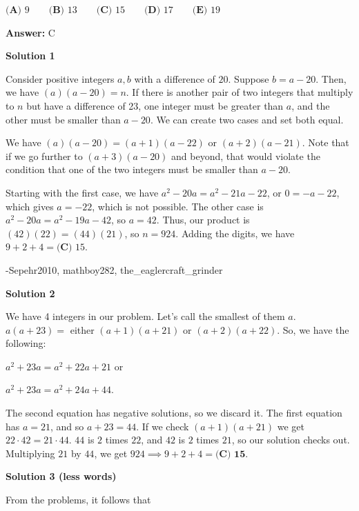 \begin{enumerate}
 $\textbf{(A) } 9 \qquad \textbf{(B) } 13\qquad \textbf{(C) } 15 \qquad \textbf{(D) } 17 \qquad \textbf{(E) } 19$

 \textbf{Answer: }C



\textbf{Solution 1}

Consider positive integers $a, b$ with a difference of $20$. Suppose $b = a-20$. Then, we have $(a)(a-20) = n$. If there is another pair of two integers that multiply to $n$ but have a difference of 23, one integer must be greater than $a$, and the other must be smaller than $a-20$. We can create two cases and set both equal. 

 We have $(a)(a-20) = (a+1)(a-22) \text{ or } (a+2)(a-21).$ Note that if we go further to $(a+3)(a-20)$ and beyond, that would violate the condition that one of the two integers must be smaller than $a-20.$

 Starting with the first case, we have $a^2-20a = a^2-21a-22$, or $0=-a-22$, which gives $a=-22$, which is not possible. The other case is $a^2-20a = a^2-19a-42$, so $a=42$. Thus, our product is $(42)(22) = (44)(21)$, so $n = 924$. Adding the digits, we have $9+2+4 = \boxed{\textbf{(C) } 15}$.

 -Sepehr2010, mathboy282, the\_eaglercraft\_grinder

 



\textbf{Solution 2}

We have 4 integers in our problem. Let's call the smallest of them $a$. $a(a+23) =$ either $(a+1)(a+21)$ or $(a+2)(a+22)$. So, we have the following:

 $a^2 + 23a = a^2 + 22a +21$ or 

 $a^2+23a = a^2 + 24a +44$.

 The second equation has negative solutions, so we discard it. The first equation has $a = 21$, and so $a + 23 = 44$. If we check $(a+1)(a+21)$ we get $22 \cdot 42 = 21 \cdot 44$. $44$ is $2$ times $22$, and $42$ is $2$ times $21$, so our solution checks out. Multiplying $21$ by $44$, we get $924 \implies 9 + 2 + 4 = \boxed{\textbf{(C) 15}}$. 

 



\textbf{Solution 3 (less words)}

From the problems, it follows that


\end{enumerate}

